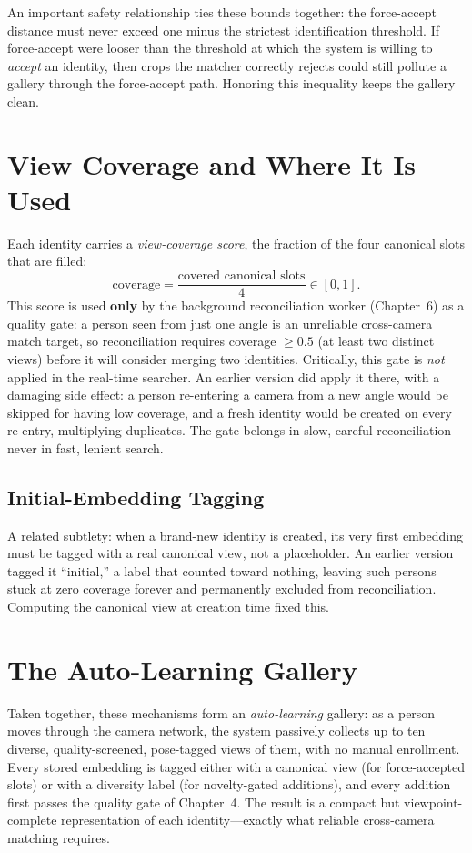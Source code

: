 \documentclass[12pt]{report}
\begin{document}
An important safety relationship ties these bounds together: the force-accept distance must never exceed one minus the strictest identification threshold. If force-accept were looser than the threshold at which the system is willing to \emph{accept} an identity, then crops the matcher correctly rejects could still pollute a gallery through the force-accept path. Honoring this inequality keeps the gallery clean.

\section{View Coverage and Where It Is Used}
Each identity carries a \emph{view-coverage score}, the fraction of the four canonical slots that are filled:
\[
\text{coverage} = \frac{\text{covered canonical slots}}{4} \in [0, 1].
\]
This score is used \textbf{only} by the background reconciliation worker (Chapter~6) as a quality gate: a person seen from just one angle is an unreliable cross-camera match target, so reconciliation requires coverage $\geq 0.5$ (at least two distinct views) before it will consider merging two identities. Critically, this gate is \emph{not} applied in the real-time searcher. An earlier version did apply it there, with a damaging side effect: a person re-entering a camera from a new angle would be skipped for having low coverage, and a fresh identity would be created on every re-entry, multiplying duplicates. The gate belongs in slow, careful reconciliation---never in fast, lenient search.

\subsection{Initial-Embedding Tagging}
A related subtlety: when a brand-new identity is created, its very first embedding must be tagged with a real canonical view, not a placeholder. An earlier version tagged it ``initial,'' a label that counted toward nothing, leaving such persons stuck at zero coverage forever and permanently excluded from reconciliation. Computing the canonical view at creation time fixed this.

\section{The Auto-Learning Gallery}
Taken together, these mechanisms form an \emph{auto-learning} gallery: as a person moves through the camera network, the system passively collects up to ten diverse, quality-screened, pose-tagged views of them, with no manual enrollment. Every stored embedding is tagged either with a canonical view (for force-accepted slots) or with a diversity label (for novelty-gated additions), and every addition first passes the quality gate of Chapter~4. The result is a compact but viewpoint-complete representation of each identity---exactly what reliable cross-camera matching requires.
\end{document}
